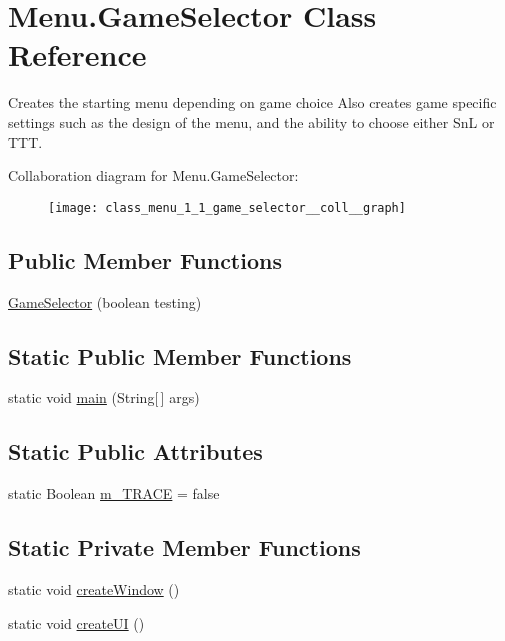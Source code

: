 \hypertarget{class_menu_1_1_game_selector}{}\section{Menu.\+Game\+Selector Class Reference}
\label{class_menu_1_1_game_selector}


Creates the starting menu depending on game choice Also creates game specific settings such as the design of the menu, and the ability to choose either Sn\+L or T\+T\+T.  




Collaboration diagram for Menu.\+Game\+Selector\+:\nopagebreak
\begin{figure}[H]
\begin{center}
\leavevmode
\texttt{[image: class\_menu\_1\_1\_game\_selector\_\_coll\_\_graph]}
\end{center}
\end{figure}
\subsection*{Public Member Functions}
\begin{DoxyCompactItemize}
\item 
\hyperlink{class_menu_1_1_game_selector_adbafa9df1cdafc14b39cb120c6ee649a}{Game\+Selector} (boolean testing)
\end{DoxyCompactItemize}
\subsection*{Static Public Member Functions}
\begin{DoxyCompactItemize}
\item 
static void \hyperlink{class_menu_1_1_game_selector_acc61bbafb5fd894b403d5e0826ef2030}{main} (String\mbox{[}$\,$\mbox{]} args)
\end{DoxyCompactItemize}
\subsection*{Static Public Attributes}
\begin{DoxyCompactItemize}
\item 
static Boolean \hyperlink{class_menu_1_1_game_selector_a2eb9bf5de7be21be696db9228f4bff0f}{m\+\_\+\+T\+R\+A\+C\+E} = false
\end{DoxyCompactItemize}
\subsection*{Static Private Member Functions}
\begin{DoxyCompactItemize}
\item 
static void \hyperlink{class_menu_1_1_game_selector_a657e217de86042e8190a28fdde3eac9d}{create\+Window} ()
\item 
static void \hyperlink{class_menu_1_1_game_selector_afabfb42f9fedc64129e47d68ef0f7b4d}{create\+U\+I} ()
\end{DoxyCompactItemize}
